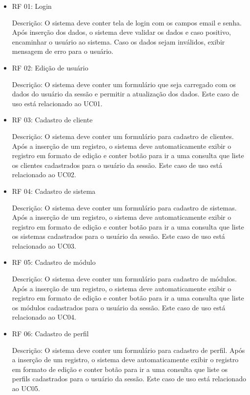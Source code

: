 \begin{itemize}
	
	
\item RF 01: Login


Descrição: O sistema deve conter tela de login com os campos email e senha. Após inserção dos dados, o sistema deve validar os dados e caso positivo, encaminhar o usuário ao sistema. Caso os dados sejam inválidos, exibir mensagem de erro para o usuário.


\item RF 02: Edição de usuário


Descrição: O sistema deve conter um formulário que seja carregado com os dados do usuário da sessão e permitir a atualização dos dados. Este caso de uso está relacionado ao UC01.


\item RF 03: Cadastro de cliente


Descrição: O sistema deve conter um formulário para cadastro de clientes. Após a inserção de um registro, o sistema deve automaticamente exibir o registro em formato de edição e conter botão para ir a uma consulta que liste os clientes cadastrados para o usuário da sessão. Este caso de uso está relacionado ao UC02.


\item RF 04: Cadastro de sistema


Descrição: O sistema deve conter um formulário para cadastro de sistemas. Após a inserção de um registro, o sistema deve automaticamente exibir o registro em formato de edição e conter botão para ir a uma consulta que liste os sistemas cadastrados para o usuário da sessão. Este caso de uso está relacionado ao UC03.


\item RF 05: Cadastro de módulo


Descrição: O sistema deve conter um formulário para cadastro de módulos. Após a inserção de um registro, o sistema deve automaticamente exibir o registro em formato de edição e conter botão para ir a uma consulta que liste os módulos cadastrados para o usuário da sessão. Este caso de uso está relacionado ao UC04.


\item RF 06: Cadastro de perfil


Descrição: O sistema deve conter um formulário para cadastro de perfil. Após a inserção de um registro, o sistema deve automaticamente exibir o registro em formato de edição e conter botão para ir a uma consulta que liste os perfils cadastrados para o usuário da sessão. Este caso de uso está relacionado ao UC05.



\end{itemize}
